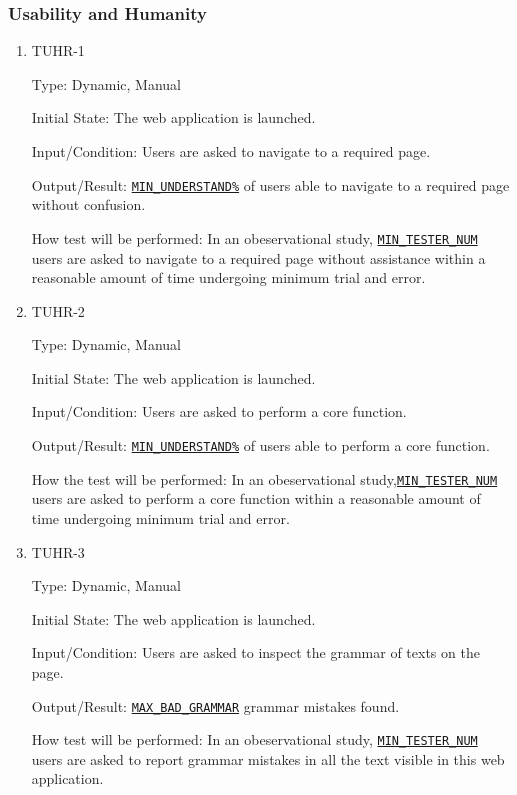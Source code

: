 \documentclass[12pt, titlepage]{article}
\begin{document}
\begin{enumerate}
\subsubsection{Usability and Humanity}

\begin{enumerate}
\item{TUHR-1\\}\label{TUHR-1}

Type: Dynamic, Manual
					
Initial State: The web application is launched.
					
Input/Condition: Users are asked to navigate to a required page.
					
Output/Result: \hyperref[MIN_UNDERSTAND]{\texttt{MIN\_UNDERSTAND\%}} of users able to navigate to a required page without confusion.
					
How test will be performed: In an obeservational study, \hyperref[MIN_TESTER_NUM]{\texttt{MIN\_TESTER\_NUM}} users are asked to navigate to a required page without assistance within a reasonable amount of time undergoing minimum trial and error.

\item{TUHR-2\\}\label{TUHR-2}

Type: Dynamic, Manual
					
Initial State: The web application is launched.
					
Input/Condition: Users are asked to perform a core function.
					
Output/Result: \hyperref[MIN_UNDERSTAND]{\texttt{MIN\_UNDERSTAND\%}} of users able to perform a core function.
					
How the test will be performed: In an obeservational study,\hyperref[MIN_TESTER_NUM]{\texttt{MIN\_TESTER\_NUM}} users are asked to perform a core function within a reasonable amount of time undergoing minimum trial and error.
\item{TUHR-3\\}\label{TUHR-3}

Type: Dynamic, Manual
					
Initial State: The web application is launched.
					
Input/Condition: Users are asked to inspect the grammar of texts on the page.
					
Output/Result: \hyperref[MAX_BAD_GRAMMAR]{\texttt{MAX\_BAD\_GRAMMAR}} grammar mistakes found.
					
How test will be performed: In an obeservational study, \hyperref[MIN_TESTER_NUM]{\texttt{MIN\_TESTER\_NUM}} users are asked to report grammar mistakes in all the text visible in this web application.


\end{enumerate}
\end{enumerate}
\end{document}
